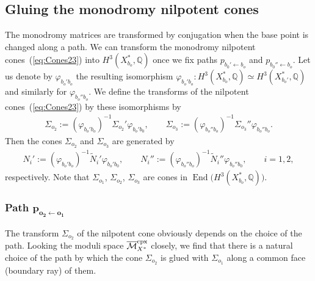 \documentclass[10pt,a4paper]{amsart}
\numberwithin{equation}{section}
\begin{document}
\subsection{Gluing the monodromy nilpotent cones} \label{sub:Gluing-MN-subsec}

The monodromy matrices are transformed by conjugation when the base point is changed along a path. We can transform the monodromy nilpotent cones~(\ref{eq:Cones23}) into $H^{3}(X_{b_{o}}^{*},\mathbb{Q})$ once we fix paths $p_{b_{0}'\leftarrow b_{o}}$ and $p_{b_{0}''\leftarrow b_{o}}$. Let us denote by $\varphi_{b_{o}'b_{o}}$ the resulting isomorphism $\varphi_{b_{o}'b_{o}}\colon H^{3}(X_{b_{o}}^{*},\mathbb{Q})\simeq H^{3}(X_{b_{o}'}^{*},\mathbb{Q})$ and similarly for $\varphi_{b_{o}''b_{o}}$. We define the transforms of the nilpotent cones~(\ref{eq:Cones23}) by these isomorphisms by
\begin{gather*}
\Sigma_{o_{2}}:=(\varphi_{b_{o}'b_{o}})^{-1} \Sigma_{o_{2}}' \varphi_{b_{o}'b_{0}} ,\qquad \Sigma_{o_{3}}:=(\varphi_{b_{o}''b_{o}})^{-1} \Sigma_{o_{3}}'' \varphi_{b_{o}''b_{o}}.%
\end{gather*}
Then the cones $\Sigma_{o_{2}}$ and $\Sigma_{o_{3}}$ are generated by
\begin{gather*}
N_{i}':=(\varphi_{b_{o}'b_{o}})^{-1} \tilde{N}_{i}' \varphi_{b_{o}'b_{0}},\qquad N_{i}'':=(\varphi_{b_{o}''b_{o}})^{-1} \tilde{N}_{i}'' \varphi_{b_{o}''b_{0}}, \qquad i=1,2,
\end{gather*} respectively. Note that $\Sigma_{o_{1}}$, $\Sigma_{o_{2}}$, $\Sigma_{o_{3}}$ are cones in $\operatorname{End}\big(H^{3}(X_{b_{o}}^{*},\mathbb{Q})\big)$.

\subsubsection[Path $p_{{o_2}\leftarrow {o_1}}$]{Path $\boldsymbol{p_{{o_2}\leftarrow {o_1}}}$}

The transform $\Sigma_{o_{2}}$ of the nilpotent cone obviously depends on the choice of the path. Looking the moduli space $\overline{\mathcal{M}}_{X^{*}}^{\rm cpx}$ closely, we find that there is a natural choice of the path by which the cone $\Sigma_{o_{2}}$ is glued with $\Sigma_{o_{1}}$ along a common face (boundary ray) of them.
\end{document}
